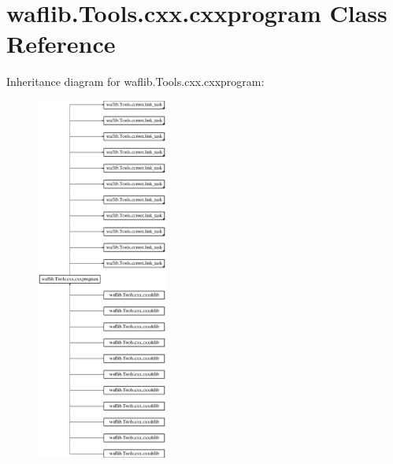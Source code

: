 \hypertarget{classwaflib_1_1_tools_1_1cxx_1_1cxxprogram}{}\section{waflib.\+Tools.\+cxx.\+cxxprogram Class Reference}
\label{classwaflib_1_1_tools_1_1cxx_1_1cxxprogram}
Inheritance diagram for waflib.\+Tools.\+cxx.\+cxxprogram\+:\begin{figure}[H]
\begin{center}
\leavevmode
\includegraphics[height=12.000000cm]{classwaflib_1_1_tools_1_1cxx_1_1cxxprogram}
\end{center}
\end{figure}
